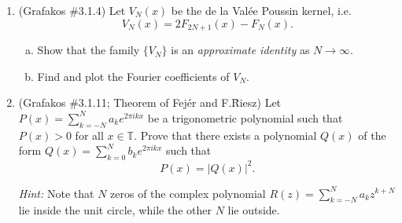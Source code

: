 \documentclass[a4paper]{article}
\begin{document}
\begin{enumerate}
\begin{proof}
\end{proof}

\item  (Grafakos \#3.1.4) Let $V_N (x)$ be the de la Val\'{e}e Poussin   kernel, i.e. $$ V_N (x) = 2 F_{2N+1} (x) - F_N (x). $$

\begin{enumerate}[(a)]
\item Show that the family $\{ V_N \}$ is an {\it{approximate identity}} as $N\rightarrow \infty$.
\item Find and plot the Fourier coefficients of $V_N$.
\end{enumerate}
\item  (Grafakos \#3.1.11; Theorem of Fej\'er and F.\~Riesz)  Let $\displaystyle{ P(x) = \sum_{k=-N}^N a_k e^{2\pi i k x} }$ be a trigonometric polynomial such that $ P(x) > 0$ for all $x\in \mathbb T$. Prove that there exists a polynomial  $Q(x)$ of the form  $\displaystyle{ Q(x) = \sum_{k=0}^N b_k e^{2\pi i k x} }$ such that $$P (x) = | Q(x) |^2 . $$

{\it{Hint:}}  Note that $N$ zeros of the complex polynomial   $\displaystyle{ R(z) = \sum_{k=-N}^N a_k z^{k+N} }$ lie inside the unit circle, while the other $N$ lie outside.

\end{enumerate}
\end{document}
